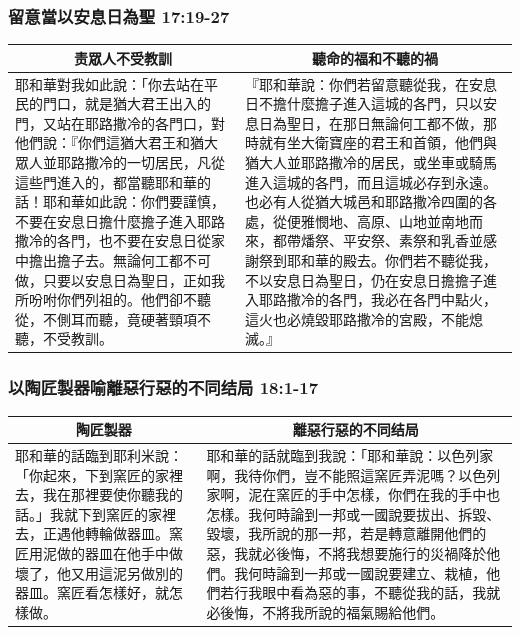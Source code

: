 \subsubsection{留意當以安息日為聖 17:19-27}
\begin{table}[H]
\centering
\begin{tabular}{p{7.75cm}|p{9.50cm}}\hline\hline
\multicolumn{1}{c|}{责眾人不受教訓}&\multicolumn{1}{c}{聽命的福和不聽的禍}\\\hline
耶和華對我如此說：「你去站在平民的門口，就是猶大君王出入的門，又站在耶路撒冷的各門口，對他們說：『你們這猶大君王和猶大眾人並耶路撒冷的一切居民，凡從這些門進入的，都當聽耶和華的話！耶和華如此說：你們要謹慎，不要在安息日擔什麼擔子進入耶路撒冷的各門，也不要在安息日從家中擔出擔子去。無論何工都不可做，只要以安息日為聖日，正如我所吩咐你們列祖的。他們卻不聽從，不側耳而聽，竟硬著頸項不聽，不受教訓。
&『耶和華說：你們若留意聽從我，在安息日不擔什麼擔子進入這城的各門，只以安息日為聖日，在那日無論何工都不做，那時就有坐大衛寶座的君王和首領，他們與猶大人並耶路撒冷的居民，或坐車或騎馬進入這城的各門，而且這城必存到永遠。也必有人從猶大城邑和耶路撒冷四圍的各處，從便雅憫地、高原、山地並南地而來，都帶燔祭、平安祭、素祭和乳香並感謝祭到耶和華的殿去。你們若不聽從我，不以安息日為聖日，仍在安息日擔擔子進入耶路撒冷的各門，我必在各門中點火，這火也必燒毀耶路撒冷的宮殿，不能熄滅。』\\\hline
\end{tabular}
\end{table}


\subsubsection{以陶匠製器喻離惡行惡的不同结局 18:1-17}
\begin{table}[H]
\centering
\begin{tabular}{p{}|p{11.0cm}}\hline\hline
\multicolumn{1}{c|}{陶匠製器}&\multicolumn{1}{c}{離惡行惡的不同结局}\\\hline
耶和華的話臨到耶利米說：「你起來，下到窯匠的家裡去，我在那裡要使你聽我的話。」我就下到窯匠的家裡去，正遇他轉輪做器皿。窯匠用泥做的器皿在他手中做壞了，他又用這泥另做別的器皿。窯匠看怎樣好，就怎樣做。
&耶和華的話就臨到我說：「耶和華說：以色列家啊，我待你們，豈不能照這窯匠弄泥嗎？以色列家啊，泥在窯匠的手中怎樣，你們在我的手中也怎樣。我何時論到一邦或一國說要拔出、拆毀、毀壞，我所說的那一邦，若是轉意離開他們的惡，我就必後悔，不將我想要施行的災禍降於他們。我何時論到一邦或一國說要建立、栽植，他們若行我眼中看為惡的事，不聽從我的話，我就必後悔，不將我所說的福氣賜給他們。\\\hline
\end{tabular}
\end{table}





